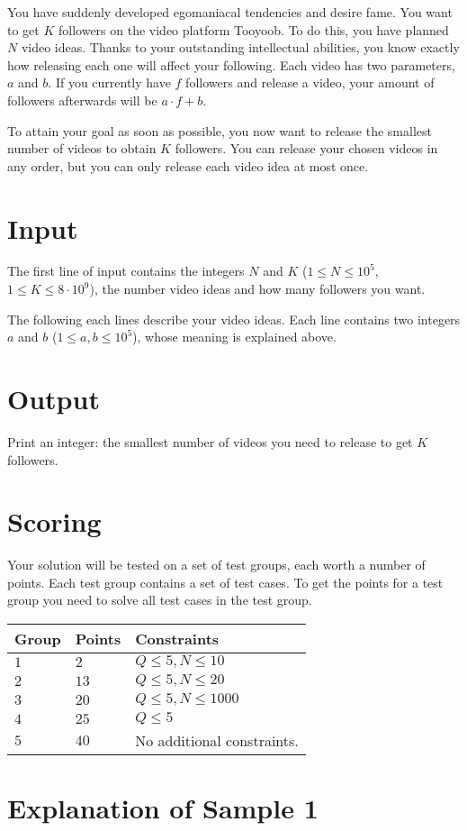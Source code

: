 
\noindent
You have suddenly developed egomaniacal tendencies and desire fame. You want to get $K$ followers on the video platform
Tooyoob. To do this, you have planned $N$ video ideas. Thanks to your outstanding intellectual abilities, you know exactly
how releasing each one will affect your following. Each video has two parameters, $a$ and $b$. If you currently have $f$ followers
and release a video, your amount of followers afterwards will be $a \cdot f + b$. 

To attain your goal as soon as possible, you now want to release the smallest number of videos to obtain $K$ followers.
You can release your chosen videos in any order, but you can only release each video idea at most once.

\section*{Input}
The first line of input contains the integers $N$ and $K$ ($1 \le N \le 10^5$, $1 \leq K \leq 8 \cdot 10^9$), the number video ideas
and how many followers you want.

The following each lines describe your video ideas. Each line contains two integers $a$ and $b$ ($1 \leq a, b \leq 10^5$),
whose meaning is explained above.

\section*{Output}
Print an integer: the smallest number of videos you need to release to get $K$ followers.

\section*{Scoring}
Your solution will be tested on a set of test groups, each worth a number of points. Each test group contains
a set of test cases. To get the points for a test group you need to solve all test cases in the test group.

\noindent
\begin{tabular}{| l | l | p{12cm} |}
  \hline
  \textbf{Group} & \textbf{Points} & \textbf{Constraints} \\ \hline
  $1$    & $2$        & $Q \leq 5, N \leq 10$ \\ \hline
  $2$    & $13$       & $Q \leq 5, N \leq 20$ \\ \hline
  $3$    & $20$       & $Q \leq 5, N \leq 1000$ \\ \hline
  $4$    & $25$       & $Q \leq 5$ \\ \hline
  $5$    & $40$       & No additional constraints. \\ \hline
\end{tabular}

\section*{Explanation of Sample 1}
